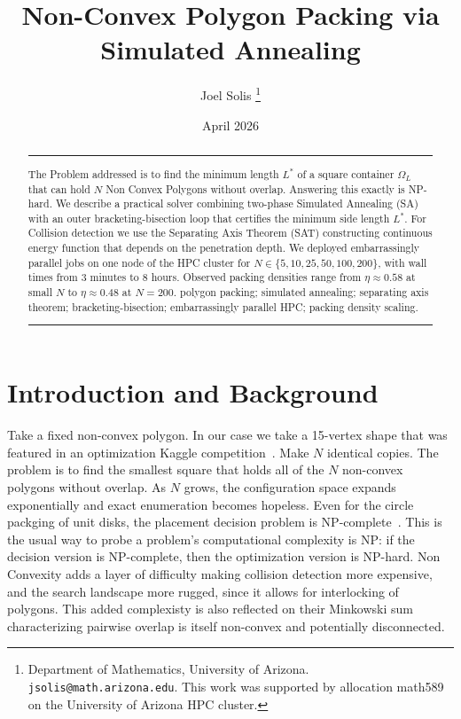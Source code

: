 \documentclass[10pt,twocolumn]{article}
\title{%
  \Large\bfseries
  Non-Convex Polygon Packing via Simulated Annealing%
}
\author{%
  Joel Solis%
  \thanks{Department of Mathematics, University of Arizona.
          \texttt{jsolis@math.arizona.edu}.
          This work was supported by allocation math589 on the
          University of Arizona HPC cluster.}%
}
\date{April 2026}
\begin{document}

\maketitle
\thispagestyle{firstpage}

\begin{abstract}
\vspace{-2pt}
\noindent\rule{\linewidth}{0.4pt}\vspace{4pt}

\enspace\small
The Problem addressed is to find the minimum length $L^*$ of a square container $\Omega_L$
 that can hold $N$ Non Convex Polygons without overlap.
Answering this exactly is NP-hard. We describe a practical solver
combining two-phase Simulated Annealing (SA) with an outer
bracketing-bisection loop that certifies the minimum side length $L^*$.
 For Collision detection we use
the Separating Axis Theorem (SAT) constructing
 continuous energy function that depends on the penetration depth. We deployed embarrassingly
parallel jobs on one node of the HPC cluster for $N \in \{5, 10, 25, 50,
100, 200\}$, with wall times from 3 minutes to 8 hours. Observed
packing densities range from $\eta \approx 0.58$ at small $N$ to
$\eta \approx 0.48$ at $N = 200$.
\vspace{5pt}
\enspace\small
polygon packing; simulated annealing; separating axis theorem;
bracketing-bisection; embarrassingly parallel HPC; packing density scaling.

\vspace{4pt}
\noindent\rule{\linewidth}{0.4pt}
\vspace{2pt}
\end{abstract}

\section{Introduction and Background}
\label{sec:intro}

Take a fixed non-convex polygon. In our case we take a 15-vertex shape
that was featured in an optimization Kaggle competition~\cite{2025kaggle}.
Make $N$ identical copies. The problem is to find the smallest square that holds all of
the $N$ non-convex polygons without overlap. As $N$ grows, the configuration space expands
exponentially and exact enumeration becomes hopeless. Even for the circle packging
of unit disks, the placement decision problem is NP-complete~\cite{demaine2007}.
This is the usual way to probe a problem's computational complexity is NP:
 if the decision version is NP-complete, then the optimization version is NP-hard.
Non Convexity adds a layer of difficulty making collision detection 
more expensive, and the search landscape more rugged, since it allows for interlocking of polygons.
This added complexisty is also reflected on their Minkowski sum
characterizing pairwise overlap is itself non-convex and potentially
disconnected.
\end{document}
